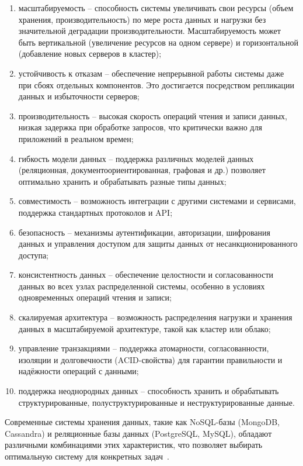 \begin{enumerate}[wide=12.5mm, leftmargin=12.5mm]
    \item масштабируемость -- способность системы увеличивать свои ресурсы (объем хранения, производительность) по мере роста данных и нагрузки без значительной деградации производительности. Масштабируемость может быть вертикальной (увеличение ресурсов на одном сервере) и горизонтальной (добавление новых серверов в кластер);
    \item устойчивость к отказам -- обеспечение непрерывной работы системы даже при сбоях отдельных компонентов. Это достигается посредством репликации данных и избыточности серверов;
    \item производительность -- высокая скорость операций чтения и записи данных, низкая задержка при обработке запросов, что критически важно для приложений в реальном времен;
    \item гибкость модели данных -- поддержка различных моделей данных (реляционная, документоориентированная, графовая и др.) позволяет оптимально хранить и обрабатывать разные типы данных;
    \item совместимость -- возможность интеграции с другими системами и сервисами, поддержка стандартных протоколов и API;
    \item безопасность -- механизмы аутентификации, авторизации, шифрования данных и управления доступом для защиты данных от несанкционированного доступа;
    \item консистентность данных -- обеспечение целостности и согласованности данных во всех узлах распределенной системы, особенно в условиях одновременных операций чтения и записи;
    \item скалируемая архитектура -- возможность распределения нагрузки и хранения данных в масштабируемой архитектуре, такой как кластер или облако;
    \item управление транзакциями -- поддержка атомарности, согласованности, изоляции и долговечности (ACID-свойства) для гарантии правильности и надёжности операций с данными;
    \item поддержка неоднородных данных -- способность хранить и обрабатывать структурированные, полуструктурированные и неструктурированные данные.
\end{enumerate}

Современные системы хранения данных, такие как NoSQL-базы (MongoDB, Cassandra) и реляционные базы данных (PostgreSQL, MySQL), обладают различными комбинациями этих характеристик, что позволяет выбирать оптимальную систему для конкретных задач~\cite{mongo, cassandra, postgres, mySQL}.

